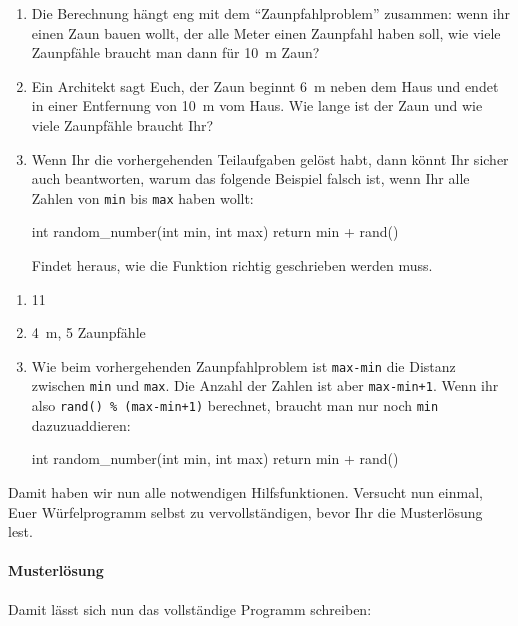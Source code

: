 \begin{exercise}
    \begin{enumerate}[label=\roman*)]
    \item 
        Die Berechnung hängt eng mit dem ``Zaunpfahlproblem'' zusammen: wenn ihr einen Zaun bauen wollt, der alle Meter einen Zaunpfahl haben soll, wie viele Zaunpfähle braucht man dann für \qty{10}{\meter} Zaun?
    
    \item 
        Ein Architekt sagt Euch, der Zaun beginnt \qty{6}{\meter} neben dem Haus und endet in einer Entfernung von \qty{10}{\meter} vom Haus. Wie lange ist der Zaun und wie viele Zaunpfähle braucht Ihr?

    \item 
        Wenn Ihr die vorhergehenden Teilaufgaben gelöst habt, dann könnt Ihr sicher auch beantworten, warum das folgende Beispiel falsch ist, wenn Ihr alle Zahlen von \texttt{min} bis \texttt{max} haben wollt:
\begin{code}[numbers=none]
int random_number(int min, int max) {
    return min + rand() %
}
\end{code}
        Findet heraus, wie die Funktion richtig geschrieben werden muss.
    \end{enumerate}

    \begin{solution}
        \begin{enumerate}[label=\roman*)]
        \item 11
        \item \qty{4}{\meter}, 5 Zaunpfähle
        \item 
            Wie beim vorhergehenden Zaunpfahlproblem ist \texttt{max-min} die Distanz zwischen \texttt{min} und \texttt{max}. Die Anzahl der Zahlen ist aber \texttt{max-min+1}. Wenn ihr also \texttt{rand() \% (max-min+1)} berechnet, braucht man nur noch \texttt{min} dazuzuaddieren:
\begin{code}[numbers=none]
int random_number(int min, int max) {
    return min + rand() %
}
\end{code}
        \end{enumerate}
    \end{solution}
\end{exercise}

\noindent
Damit haben wir nun alle notwendigen Hilfsfunktionen. Versucht nun einmal, Euer Würfelprogramm selbst zu vervollständigen, bevor Ihr die Musterlösung lest.

\vfill
\paragraph{Musterlösung} %

Damit lässt sich nun das vollständige Programm schreiben:
